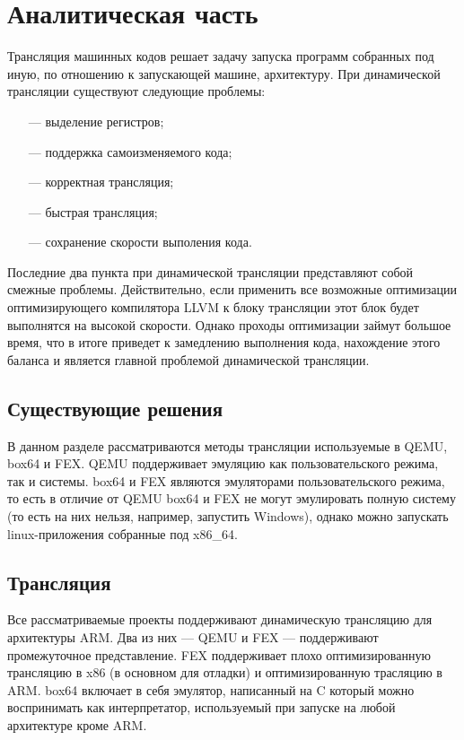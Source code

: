 \section{Аналитическая часть}
 
Трансляция машинных кодов решает задачу запуска программ собранных под иную, по отношению к запускающей машине, архитектуру. При динамической трансляции существуют следующие проблемы:

\begin{itemize}[leftmargin=1.6\parindent]
	\item[---] выделение регистров;
	\item[---] поддержка самоизменяемого кода;
	\item[---] корректная трансляция;
	\item[---] быстрая трансляция;
	\item[---] сохранение скорости выполения кода.
\end{itemize}

Последние два пункта при динамической трансляции представляют собой смежные проблемы. Действительно, если применить все возможные оптимизации оптимизирующего компилятора LLVM к блоку трансляции этот блок будет выполнятся на высокой скорости. Однако проходы оптимизации займут большое время, что в итоге приведет к замедлению выполнения кода, нахождение этого баланса и является главной проблемой динамической трансляции. 

\subsection{Существующие решения}

В данном разделе рассматриваются методы трансляции используемые в QEMU, box64 и FEX. QEMU поддерживает эмуляцию как пользовательского режима, так и системы. box64 и FEX являются эмуляторами пользовательского режима, то есть в отличие от QEMU box64 и FEX не могут эмулировать полную систему (то есть на них нельзя, например, запустить Windows), однако можно запускать linux-приложения собранные под x86\_64.

\subsection{Трансляция}

Все рассматриваемые проекты поддерживают динамическую трансляцию для архитектуры ARM. Два из них --- QEMU и FEX --- поддерживают промежуточное представление. FEX поддерживает плохо оптимизированную трансляцию в x86 (в основном для отладки) и оптимизированную трасляцию в ARM. box64 включает в себя эмулятор, написанный на C который можно воспринимать как интерпретатор, используемый при запуске на любой архитектуре кроме ARM.

